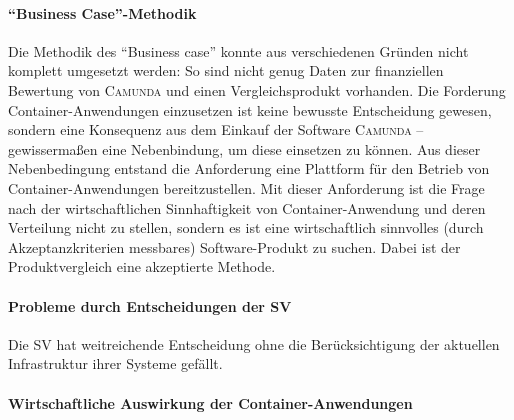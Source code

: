\paragraph{\enquote{Business Case}-Methodik} Die Methodik des \enquote{Business case} konnte aus verschiedenen Gründen nicht komplett umgesetzt werden: So sind nicht genug Daten zur finanziellen Bewertung von \textsc{Camunda} und einen Vergleichsprodukt vorhanden. Die Forderung Container-Anwendungen einzusetzen ist keine bewusste Entscheidung gewesen, sondern eine Konsequenz aus dem Einkauf der Software \textsc{Camunda} -- gewissermaßen eine Nebenbindung, um diese einsetzen zu können. Aus dieser Nebenbedingung entstand die Anforderung eine Plattform für den Betrieb von Container-Anwendungen bereitzustellen. Mit dieser Anforderung ist die Frage nach der wirtschaftlichen Sinnhaftigkeit von Container-Anwendung und deren Verteilung nicht zu stellen, sondern es ist eine wirtschaftlich sinnvolles (durch Akzeptanzkriterien messbares) Software-Produkt zu suchen. Dabei ist der Produktvergleich eine akzeptierte Methode.   

\paragraph{Probleme durch Entscheidungen der \ac{SV}} Die \ac{SV} hat weitreichende Entscheidung ohne die Berücksichtigung der aktuellen Infrastruktur ihrer Systeme gefällt.

\paragraph{Wirtschaftliche Auswirkung der Container-Anwendungen}